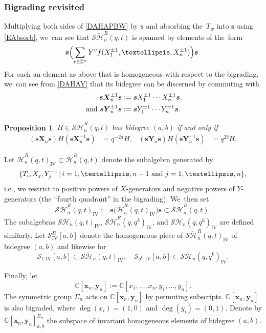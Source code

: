 \documentclass[11pt]{article}
\newcommand{\ie}{i.e.,\xspace}
\newtheorem{prop}[thm]{Proposition}
\theoremstyle{definition}
\newcommand{\ZZ}{\mathbb{Z}}
\newcommand{\CC}{\mathbb{C}}
\newcommand{\SHH}{\mathcal{S}\ddot{\mathcal{H}}}
\newcommand{\HH}{\ddot{\mathcal{H}}}
\newcommand{\ee}{\boldsymbol{s}}
\begin{document}
\subsubsection{Bigrading revisited}\label{DAHABigrad}
Multiplying both sides of \eqref{DAHAPBW} by $\ee$ and absorbing the~$T_w$ into $\ee$ using \eqref{EAbsorb}, we~can see that $\SHH_n^R(q,t)$ is spanned by elements of the~form
\[
\ee \Bigl(\sum_{v\in\ZZ^n}Y^vf(X_1^{\pm 1},\ldots, X_n^{\pm 1})\Bigr)\ee.
\]
For such an element as above that is homogeneous with respect to the bigrading, we~can see from \eqref{DAHAY} that its bidegree can be discerned by commuting with
\begin{equation}
\begin{aligned}
\ee\boldsymbol{X}_n^{\pm1}\ee&:=\ee X_1^{\pm 1}\cdots X_n^{\pm 1}\ee,\\
\hbox{ and }\ee\boldsymbol{Y}_n^{\pm 1}\ee&:=\ee Y_1^{\pm 1}\cdots Y_n^{\pm 1}\ee.
\end{aligned}
\label{DAHADet}
\end{equation}
\begin{prop}
$H\in\SHH_n^R(q,t)$ has bidegree $(a,b)$ if and only if
\begin{align*}
\left(\ee \boldsymbol{X}_n\ee\right) H \left(\ee \boldsymbol{X}_n^{-1}\ee\right)&= q^{-2a}H,&
\left(\ee \boldsymbol{Y}_n\ee\right) H \left(\ee \boldsymbol{Y}_n^{-1}\ee\right)&= q^{2b}H.
\end{align*}
\end{prop}

Let $\HH_n^R(q,t)_{\textrm{IV}}\subset\HH_n^R(q,t)$ denote the subalgebra generated by
\[
\{T_i, X_j, Y^{-1}_j\, |\, i=1,\ldots, n-1\hbox{ and }j=1,\ldots, n\},
\]
\ie we restrict to positive powers of $X$-generators and negative powers of $Y$-generators (the ``fourth quadrant'' in the bigrading). We~then set
\[
\SHH_n^R(q,t)_{\textrm{IV}}:=\ee\bigl(\HH_n^R(q,t)_{\textrm{IV}}\bigr)\ee\subset\SHH_n^R(q,t).
\]
The subalgebras $\SHH_n(q,t)_{\mathrm{IV}}$, $\SHH_n^R(q,q^k)_{\mathrm{IV}}$, and $\SHH_n(q,q^k)_{\mathrm{IV}}$ are defined similarly.
Let $\mathcal{S}^R_{\mathrm{IV}}[a,b]$ denote the homogeneous piece of $\SHH_n^R(q,t)_{\mathrm{IV}}$ of bidegree $(a,b)$ and likewise for
\[
\mathcal{S}_{t,\mathrm{IV}}[a,b]\subset\SHH_n(q,t)_{\mathrm{IV}},\quad
\mathcal{S}_{q^k,\mathrm{IV}}[a,b]\subset\SHH_n(q,q^k)_{\mathrm{IV}}.
\]

Finally, let
\[
\CC[\boldsymbol{x}_n,\boldsymbol{y}_n]:=\CC[x_1,\ldots, x_n, y_1,\ldots, y_n].
\]
The symmetric group $\Sigma_n$ acts on $\CC[\boldsymbol{x}_n,\boldsymbol{y}_n]$ by permuting subscripts.
$\CC[\boldsymbol{x}_n,\boldsymbol{y}_n]$ is also bigraded, where $\deg(x_i)=(1,0)$ and $\deg(y_i)=(0,1)$.
Denote by $\CC[\boldsymbol{x}_n,\boldsymbol{y}_n]^{\Sigma_n}_{a,b}$ the subspace of invariant homogeneous elements of bidegree $(a,b)$.
\end{document}
